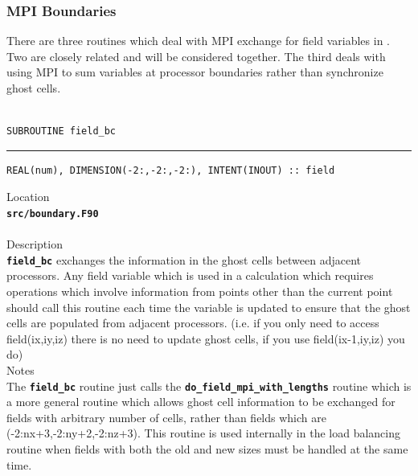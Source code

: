 \documentclass[12pt,a4paper]{article}
\newcommand{\HRule}{\rule{\linewidth}{0.5mm}}
\newcommand{\inlinecode}[1]{{\color{warwickred} \bf\texttt{#1}}}
\newcommand{\EPOCH}{{\color{warwickdark}\fontfamily{phv}\selectfont{EPOCH}}}
\newcommand{\codedef}{\begin{Verbatim}[formatcom=\color{warwickred},fontsize=\Large,hfuzz=0pt]}
\newcommand{\coderule}{
{\color{warwickred}\vspace{-0.5cm}\HRule}
\codedef}
\begin{document}
\subsubsection{MPI Boundaries}
There are three routines which deal with MPI exchange for field variables in
\EPOCH. Two are closely related and will be considered together. The third
deals with using MPI to sum variables at processor boundaries rather than
synchronize ghost cells.\\\\

\codedef
SUBROUTINE field_bc
\end{Verbatim}
\coderule
REAL(num), DIMENSION(-2:,-2:,-2:), INTENT(INOUT) :: field
\end{Verbatim}
\vspace{1cm}
{\Large Location\\}
\inlinecode{src/boundary.F90}\\
\\[0.5cm]
{\Large Description\\}
\inlinecode{field\_bc} exchanges the information in the ghost cells between
adjacent processors. Any field variable which is used in a calculation which
requires operations which involve information from points other than the
current point should call this routine each time the variable is updated to
ensure that the ghost cells are populated from adjacent processors. (i.e. if
you only need to access field(ix,iy,iz) there is no need to update ghost cells,
if you use field(ix-1,iy,iz) you do)
\\[0.5cm]
{\Large Notes\\}
The \inlinecode{field\_bc} routine just calls the
\inlinecode{do\_field\_mpi\_with\_lengths} routine which is a more general
routine which allows ghost cell information to be exchanged for fields with
arbitrary number of cells, rather than fields which are
(-2:nx+3,-2:ny+2,-2:nz+3). This routine is used internally in the load
balancing routine when fields with both the old and new sizes must be handled
at the same time.
\end{document}
